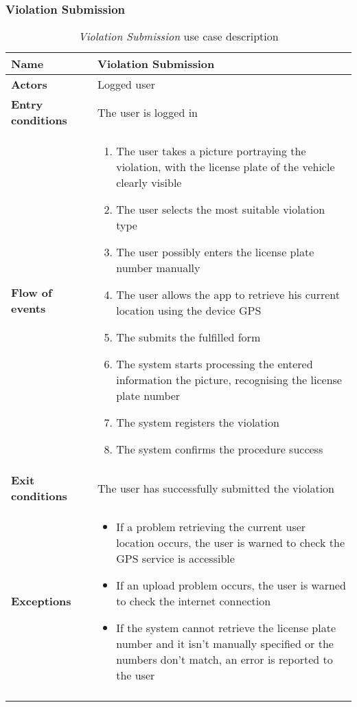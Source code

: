 \subsubsection{Violation Submission}
\begin{longtable}{p{0.25\linewidth}p{0.75\linewidth}}
\toprule
\textbf{Name} & \textbf{Violation Submission} \\
\midrule
\textbf{Actors} &  Logged user \\
\midrule
\textbf{Entry \newline conditions} & The user is logged in \\
\midrule
\textbf{Flow of events} & 
\begin{enumerate}
	\item The user takes a picture portraying the violation, with the license plate of the vehicle clearly visible
	\item The user selects the most suitable violation type
	\item The user possibly enters the license plate number manually
	\item The user allows the app to retrieve his current location using the device GPS
	\item The submits the fulfilled form
	\item The system starts processing the entered information the picture, recognising the license plate number
	\item The system registers the violation
	\item The system confirms the procedure success
\end{enumerate} \\
\midrule
\textbf{Exit conditions} & The user has successfully submitted the violation\\
\midrule
\textbf{Exceptions} & 
\begin{itemize}
	\item If a problem retrieving the current user location occurs, the user is warned to check the GPS service is accessible
	\item If an upload problem occurs, the user is warned to check the internet connection
	\item If the system cannot retrieve the license plate number and it isn't manually specified or the numbers don't match, an error is reported to the user
\end{itemize} \\
\bottomrule
\caption{\emph{Violation Submission} use case description}
\end{longtable}

